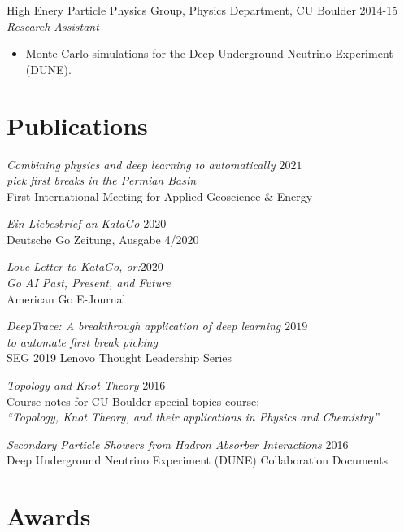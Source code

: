 \documentclass[margin]{res}
\begin{document}
\begin{resume}
                High Enery Particle Physics Group, Physics Department, CU Boulder  \hfill            2014-15 \\
		{\sl Research Assistant}
                 \begin{itemize}  \itemsep -2pt %
                 \item Monte Carlo simulations for the Deep Underground Neutrino Experiment (DUNE).
                 \end{itemize}

\section{Publications} {\sl Combining physics and deep learning to automatically \hfill            $2021$ \\ pick first breaks in the Permian Basin} \\
		First International Meeting for Applied Geoscience \& Energy

                {\sl Ein Liebesbrief an KataGo} \hfill 2020 \\
                Deutsche Go Zeitung, Ausgabe 4/2020

                {\sl Love Letter to KataGo, or:\hfill $2020$\\ Go AI Past, Present, and Future} \\
                American Go E-Journal
                
                {\sl DeepTrace: A breakthrough application of deep learning \hfill $2019$\\ to automate first break picking}  \\
                SEG 2019 Lenovo Thought Leadership Series

                {\sl Topology and Knot Theory} \hfill 2016 \\
                Course notes for CU Boulder special topics course: \\
                \textit{``Topology, Knot Theory, and their applications in Physics and Chemistry''}
                
                {\sl Secondary Particle Showers from Hadron Absorber Interactions} \hfill 2016 \\
                Deep Underground Neutrino Experiment (DUNE) Collaboration Documents

                
                \section{Awards}
                

\end{resume}
\end{document}
